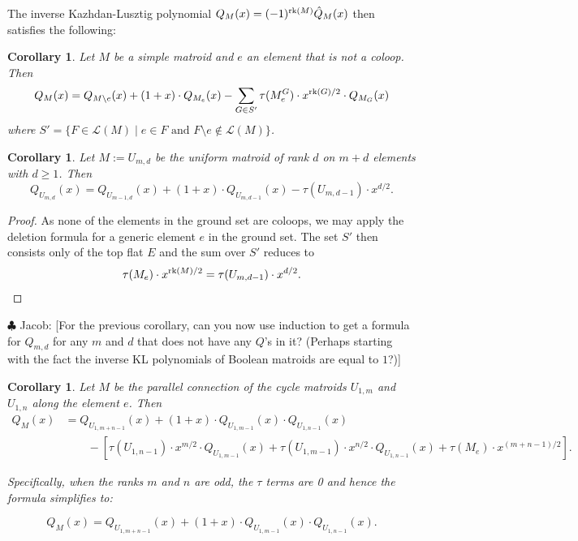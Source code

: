 \documentclass[10pt]{article}
\newcommand{\calL}{\mathcal{L}}
\newcommand{\rank}{\normalfont\text{rk}}
\newtheorem{corollary}[theorem]{Corollary}
\theoremstyle{remark}
\newcommand{\jacob}[1]{{\color{Bittersweet} \sf $\clubsuit$ Jacob: [#1]}}
\begin{document}
The inverse Kazhdan-Lusztig polynomial $Q_M(x) = (-1)^{\rank(M)}\hat{Q}_M(x)$ then satisfies the following:
\begin{corollary}
\label{cor:deletion_formula_Q}
Let $M$ be a simple matroid and $e$ an element that is not a coloop. Then
\[
    Q_M(x) = Q_{M\setminus e}(x) + (1 + x)\cdot Q_{M_e}(x) -
    \sum_{G \in S'}{\tau(M^G_e)\cdot x^{\rank(G)/2} \cdot
    Q_{M_G}(x)}
\]
where $S' = \{F\in \calL(M)\mid e\in F \text{ and } F\setminus e \notin \calL(M)\}$.
\end{corollary}
\begin{corollary}
\label{cor:deletion_formula_Q_uniform}
Let $M:=U_{m,d}$ be the uniform matroid of rank $d$ on $m+d$ elements with $d\geq 1$. Then
\[
    Q_{U_{m,d}}(x) = Q_{U_{m-1,d}}(x) + (1 + x)\cdot Q_{U_{m,d-1}}(x) -
    \tau(U_{m,d-1})\cdot x^{d/2}.
\]
\end{corollary}
\begin{proof}
    As none of the elements in the ground set are coloops, we may apply the deletion formula for a generic element $e$ in the ground set. The set $S'$ then consists only of the top flat $E$ and the sum over $S'$ reduces to \[\tau(M_e)\cdot x^{\rank(M)/2}
    = \tau(U_{m,d-1})\cdot x^{d/2}.\]
\end{proof}

\jacob{For the previous corollary, can you now use induction to get a formula for $Q_{m,d}$ for any $m$ and $d$ that does not have any $Q$'s in it?  (Perhaps starting with the fact the inverse KL polynomials of Boolean matroids are equal to $1$?)}

\begin{corollary}
\label{cor:deletion_formula_ll_connection}
Let $M$ be the parallel connection of the cycle matroids $U_{1, m}$ and $U_{1, n}$ along the element $e$. Then
\begin{align*}
    Q_{M}(x) &= Q_{U_{1, m+n-1}}(x) + (1 + x)\cdot Q_{U_{1, m-1}}(x)\cdot Q_{U_{1, n-1}}(x)\\
    &\quad\quad-\left[ \tau(U_{1, n-1}) \cdot x^{m/2} \cdot Q_{U_{1,m-1}}(x) + \tau(U_{1, m-1}) \cdot x^{n/2} \cdot Q_{U_{1,n-1}}(x)
    + \tau(M_e) \cdot x^{(m+n-1)/2}\right].
\end{align*}

Specifically, when the ranks $m$ and $n$ are odd, the $\tau$ terms are 0 and hence the formula simplifies to:

\[
    Q_{M}(x) = Q_{U_{1, m+n-1}}(x) + (1 + x)\cdot Q_{U_{1, m-1}}(x)\cdot Q_{U_{1, n-1}}(x).
\]
\end{corollary}
\end{document}
